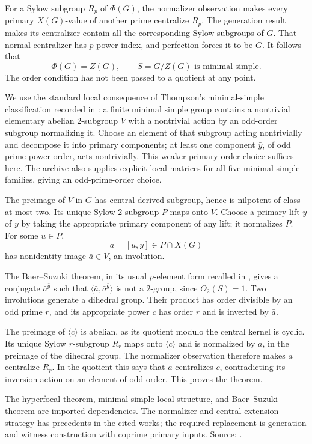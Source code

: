 For a Sylow subgroup \(R_p\) of \(\Phi(G)\),
the normalizer observation makes every primary
\(X(G)\)-value of another prime centralize
\(R_p\). The generation result makes its
centralizer contain all the corresponding
Sylow subgroups of \(G\). That normal
centralizer has \(p\)-power index, and
perfection forces it to be \(G\). It follows that
\[
 \Phi(G)=Z(G),\qquad S=G/Z(G)\text{ is minimal simple}.
\]
The order condition has not been passed to a
quotient at any point.

We use the standard local consequence of Thompson's
minimal-simple classification recorded in
\cite[Proposition 18]{bastos-monetta}: a finite
minimal simple group contains a nontrivial
elementary abelian \(2\)-subgroup \(V\) with
a nontrivial action by an odd-order subgroup
normalizing it. Choose an element of that subgroup
acting nontrivially and decompose it into primary
components; at least one component \(\bar y\),
of odd prime-power order, acts nontrivially.
This weaker primary-order choice suffices here.
The archive also supplies explicit local matrices
for all five minimal-simple families, giving an
odd-prime-order choice.

The preimage of \(V\) in \(G\) has central derived
subgroup, hence is nilpotent of class at most two.
Its unique Sylow \(2\)-subgroup \(P\) maps onto
\(V\). Choose a primary lift \(y\) of \(\bar y\)
by taking the appropriate primary component of
any lift; it normalizes \(P\). For some \(u\in P\),
\[
 a=[u,y]\in P\cap X(G)
\]
has nonidentity image \(\bar a\in V\), an involution.

The Baer--Suzuki theorem, in its usual \(p\)-element
form recalled in \cite{guralnick-malle-baer}, gives
a conjugate \(\bar a^{\bar g}\) such that
\(\langle\bar a,\bar a^{\bar g}\rangle\) is not a
\(2\)-group, since \(O_2(S)=1\).
Two involutions generate a dihedral group.
Their product has order divisible by an odd
prime \(r\), and its appropriate power \(c\)
has order \(r\) and is inverted by \(\bar a\).

The preimage of \(\langle c\rangle\) is abelian,
as its quotient modulo the central kernel is
cyclic. Its unique Sylow \(r\)-subgroup \(R_r\)
maps onto \(\langle c\rangle\) and is normalized
by \(a\), in the preimage of the dihedral group.
The normalizer observation therefore makes \(a\)
centralize \(R_r\). In the quotient this says
that \(\bar a\) centralizes \(c\), contradicting
its inversion action on an element of odd order.
This proves the theorem.

The hyperfocal theorem, minimal-simple local
structure, and Baer--Suzuki theorem are imported
dependencies. The normalizer and central-extension
strategy has precedents in the cited works;
the required replacement is generation and
witness construction with coprime primary
inputs. Source: .
